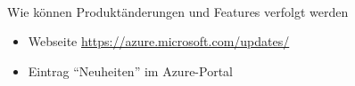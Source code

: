 \documentclass{scrartcl}
\newenvironment{flashcard}[2][]{%
    #1
    \vfill
    \centerline{\Large{#2}}
    \vfill
\newpage
}
{\newpage}
\begin{document}
    \begin{flashcard}[\ ]{Wie können Produktänderungen und Features verfolgt werden}
        \begin{itemize}
            \item Webseite \href{https://azure.microsoft.com/updates/}{https://azure.microsoft.com/updates/}
            \item Eintrag ``Neuheiten'' im Azure-Portal
        \end{itemize}

    \end{flashcard}

    \doclicenseThis
    \pagebreak
\end{document}
